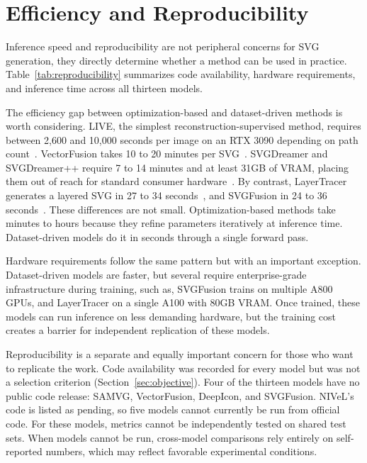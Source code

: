 \section{Efficiency and Reproducibility}
\label{sec:efficiency}

Inference speed and reproducibility are not peripheral 
concerns for SVG generation, they directly determine 
whether a method can be used in practice. 
Table~\ref{tab:reproducibility} summarizes code 
availability, hardware requirements, and inference time 
across all thirteen models.

The efficiency gap between optimization-based and 
dataset-driven methods is worth considering. LIVE, the 
simplest reconstruction-supervised method, requires 
between 2,600 and 10,000 seconds per image on an RTX 
3090 depending on path count~\cite{maLayerwiseImageVectorization2022}. 
VectorFusion takes 10 to 20 minutes per 
SVG~\cite{jainVectorFusionTexttoSVGAbstracting2022}. 
SVGDreamer and SVGDreamer++ require 7 to 14 minutes 
and at least 31GB of VRAM, placing them out of reach 
for standard consumer 
hardware~\cite{xingSVGDreamerTextGuided2024,xingSVGDreamerAdvancingEditability2025}. 
By contrast, LayerTracer generates a layered SVG in 27 
to 34 seconds~\cite{songLayerTracerCognitiveAlignedLayered2025}, 
and SVGFusion in 24 to 36 
seconds~\cite{xingSVGFusionScalableTexttoSVG2025}. These differences are not small. 
Optimization-based methods take minutes to hours because they refine parameters iteratively at inference time.
Dataset-driven models do it in seconds through a single forward pass.

Hardware requirements follow the same pattern but with 
an important exception. Dataset-driven models are faster, 
but several require enterprise-grade infrastructure during 
training, such as, SVGFusion trains on multiple A800 GPUs, and 
LayerTracer on a single A100 with 80GB VRAM. Once trained, 
these models can run inference on less demanding hardware, 
but the training cost creates a barrier for independent 
replication of these models.

Reproducibility is a separate and equally important 
concern for those who want to replicate the work.
Code availability was recorded for every model but was not 
a selection criterion (Section~\ref{sec:objective}). 
Four of the thirteen models have no public 
code release: SAMVG, VectorFusion, DeepIcon, and 
SVGFusion. NIVeL's code is listed as pending, so five 
models cannot currently be run from official code. 
For these models, metrics cannot 
be independently tested on shared test 
sets. 
When models cannot be run, cross-model comparisons rely 
entirely on self-reported numbers, which may reflect 
favorable experimental conditions. 


